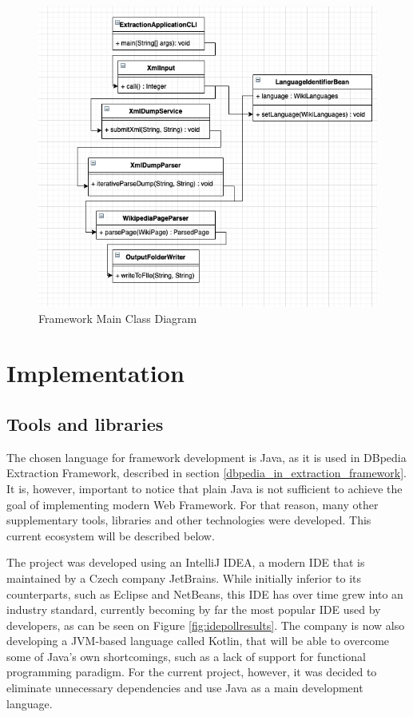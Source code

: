 \documentclass[thesis=M,english,hidelinks]{FITthesis}[2019/12/23]
\begin{document}
\begin{figure}
	\centering
	\includegraphics[width=1.0\linewidth]{framework_class_diagram}
	\caption{Framework Main Class Diagram}
	\label{fig:frameworkclassdiagram}
\end{figure}


\section{Implementation}

\subsection{Tools and libraries}

The chosen language for framework development is Java, as it is used in DBpedia Extraction Framework, described in section \ref{dbpedia_in_extraction_framework}. It is, however, important to notice that plain Java is not sufficient to achieve the goal of implementing modern Web Framework. For that reason, many other supplementary tools, libraries and other technologies were developed. This current ecosystem will be described below.

The project was developed using an IntelliJ IDEA\cite{intellij_link}, a modern  \gls{IDE} that is maintained by a Czech company JetBrains. While initially inferior to its counterparts, such as Eclipse and NetBeans, this \gls{IDE} has over time grew into an industry standard, currently becoming by far the most popular \gls{IDE} used by developers\cite{java_dev_ecosystem}, as can be seen on Figure \ref{fig:idepollresults}. The company is now also developing a JVM-based language called Kotlin, that will be able to overcome some of Java's own shortcomings, such as a lack of support for functional programming paradigm. For the current project, however, it was decided to eliminate unnecessary dependencies and use Java as a main development language. 
\end{document}
